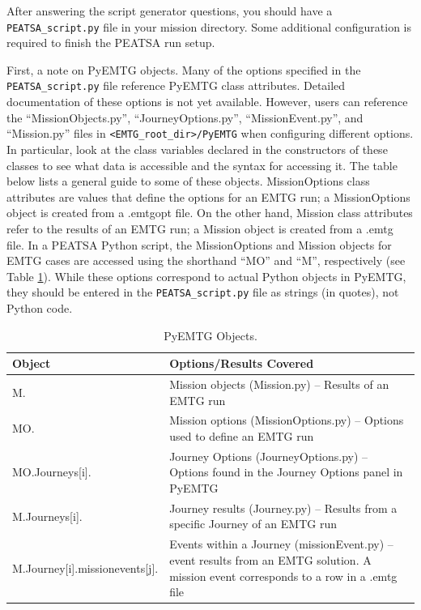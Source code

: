 \documentclass[11pt]{article}
\begin{document}
\noindent After answering the script generator questions, you should have a \texttt{PEATSA\_script.py} file in your mission directory. Some additional configuration is required to finish the \ac{PEATSA} run setup. 

\noindent First, a note on PyEMTG objects. Many of the options specified in the \texttt{PEATSA\_script.py} file reference PyEMTG class attributes. Detailed documentation of these options is not yet available. However, users can reference the ``MissionObjects.py'', ``JourneyOptions.py'', ``MissionEvent.py'', and ``Mission.py'' files in \texttt{<EMTG\_root\_dir>/PyEMTG} when configuring different options. In particular, look at the class variables declared in the constructors of these classes to see what data is accessible and the syntax for accessing it. The table below lists a general guide to some of these objects. MissionOptions class attributes are values that define the options for an \ac{EMTG} run; a MissionOptions object is created from a .emtgopt file. On the other hand, Mission class attributes refer to the results of an \ac{EMTG} run; a Mission object is created from a .emtg file. In a \ac{PEATSA} Python script, the MissionOptions and Mission objects for \ac{EMTG} cases are accessed using the shorthand ``MO'' and ``M'', respectively (see Table \ref{tab:pyemtg_objs}). While these options correspond to actual Python objects in PyEMTG, they should be entered in the \texttt{PEATSA\_script.py} file as strings (in quotes), not Python code.


\begin{table}[H]
	\begin{small}
		\begin{tabularx}{\linewidth} { >{\arraybackslash}l >{\arraybackslash} X}
			\hline
			Object & Options/Results Covered \\
			\hline 
			M.& Mission objects (Mission.py) -- Results of an \ac{EMTG} run\newline \\ 
			MO. & Mission options (MissionOptions.py) -- Options used to define an \ac{EMTG} run\newline \\ 
			MO.Journeys[i]. & Journey Options (JourneyOptions.py) -- Options found in the Journey Options panel in PyEMTG\newline \\
			M.Journeys[i]. & Journey results (Journey.py) -- Results from a specific Journey of an \ac{EMTG} run\newline \\
			M.Journey[i].missionevents[j]. & Events within a Journey (missionEvent.py) -- event results from an \ac{EMTG} solution. A mission event corresponds to a row in a .emtg file\newline \\
 			\hline
		\end{tabularx}
	\end{small}
	\caption{\label{tab:pyemtg_objs}PyEMTG Objects.}
\end{table}
\end{document}
